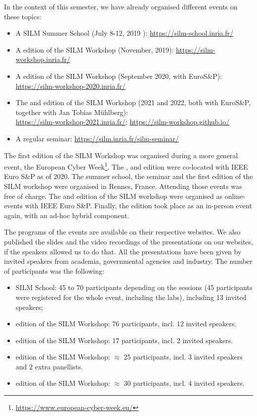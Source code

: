 \documentclass[a4paper,11pt]{article}
\begin{document}
In the context of this semester, we have already organised different events
on these topics:
%
\begin{itemize}
%
    \item A SILM Summer School (July 8-12, 2019 ):
\url{https://silm-school.inria.fr/}
%
    \item A  edition of the SILM Workshop (November, 2019):
\url{https://silm-workshop.inria.fr/}
%
    \item A  edition of the SILM Workshop (September 2020, with
EuroS\&P): \\ \url{https://silm-workshop-2020.inria.fr/}
%
    \item The  and  edition of the SILM Workshop (2021 and
2022, both with EuroS\&P, together with Jan Tobias M\"uhlberg): \\
\url{https://silm-workshop-2021.inria.fr/};
\url{https://silm-workshop.github.io/}
%
    \item A regular seminar: \url{https://silm.inria.fr/silm-seminar/}
%
\end{itemize}

The first edition of the SILM Workshop was organised during a more general
event, the European Cyber
Week\footnote{\url{https://www.european-cyber-week.eu/}}.  The ,
 and  edition were co-located with IEEE Euro S\&P as of 2020. 
% 
The summer school, the seminar and the first edition of the SILM workshop
were organised in Rennes, France. Attending those events was free of
charge. The  and  edition of the SILM workshop were organised
as online-events with IEEE Euro S\&P. Finally, the  edition took
place as an in-person event again, with an ad-hoc hybrid component.

The programs of the events are available on their respective websites. We
also published the slides and the video recordings of the presentations on
our websites, if the speakers allowed us to do that. All the presentations
have been given by invited speakers from academia, governmental agencies
and industry. The number of participants was the following:
%
\begin{itemize}
%
    \item SILM School: 45 to 70 participants depending on the sessions (45
participants were registered for the whole event, including the labs),
including 13 invited speakers;
%
    \item {} edition of the SILM Workshop: 76 participants, incl.
12 invited speakers.
%
    \item {} edition of the SILM Workshop: 17 participants, incl.
2 invited speakers.
%
    \item {} edition of the SILM Workshop: $\approx$ 25 participants,
incl. 3 invited speakers and 2 extra panellists.
%
    \item {} edition of the SILM Workshop: $\approx$ 30 participants,
incl. 4 invited speakers.
%
\end{itemize}
\end{document}
